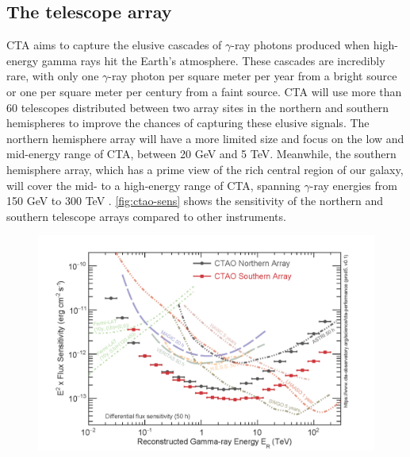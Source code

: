 \subsection{The telescope array}
\label{ss:telescope-array}
CTA aims to capture the elusive cascades of $\gamma$-ray photons produced when high-energy gamma rays hit the Earth's atmosphere. These cascades are incredibly rare, with only one $\gamma$-ray photon per square meter per year from a bright source or one per square meter per century from a faint source. CTA will use more than 60 telescopes distributed between two array sites in the northern and southern hemispheres to improve the chances of capturing these elusive signals. The northern hemisphere array will have a more limited size and focus on the low and mid-energy range of CTA, between 20 GeV and 5 TeV. Meanwhile, the southern hemisphere array, which has a prime view of the rich central region of our galaxy, will cover the mid- to a high-energy range of CTA, spanning $\gamma$-ray energies from 150 GeV to 300 TeV \cite{Acharyya201935}. \autoref{fig:ctao-sens} shows the sensitivity of the northern and southern telescope arrays compared to other instruments. 
\begin{figure}[]
\centering
\includegraphics[width=1\linewidth]{figures/introduction/ctao-sensitivity.png}
\label{fig:ctao-sens}
\end{figure}
